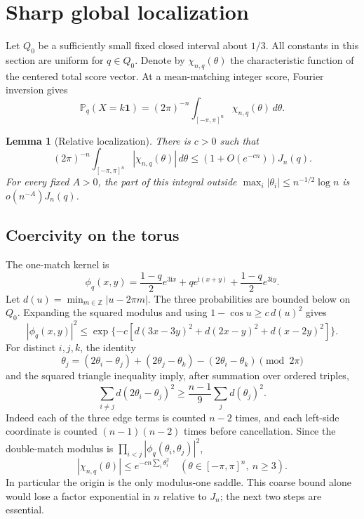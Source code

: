 \documentclass[11pt,a4paper]{article}
\numberwithin{equation}{section}
\newtheorem{lemma}[theorem]{Lemma}
\theoremstyle{remark}
\newcommand{\Prob}{\mathbb P}
\newcommand{\Z}{\mathbb Z}
\newcommand{\1}{\mathbf 1}
\newcommand{\ii}{\mathrm i}
\begin{document}
\section{Sharp global localization}\label{tfs:sec:localize}
Let $Q_0$ be a sufficiently small fixed closed interval about $1/3$.
All constants in this section are uniform for $q\in Q_0$. Denote by
$\chi_{n,q}(\theta)$ the characteristic function of the centered total
score vector. At a mean-matching integer score, Fourier inversion gives
\[
\Prob_q(X=k\1)=(2\pi)^{-n}\int_{[-\pi,\pi]^n}\chi_{n,q}(\theta)\,d\theta.
\]

\begin{lemma}[Relative localization]\label{tfs:lem:localize}
There is $c>0$ such that
\begin{equation}\label{tfs:eq:integralbound}
(2\pi)^{-n}\int_{[-\pi,\pi]^n}|\chi_{n,q}(\theta)|\,d\theta
       \leq (1+O(e^{-cn}))J_n(q).
\end{equation}
For every fixed $A>0$, the part of this integral outside
$\max_i|\theta_i|\leq n^{-1/2}\log n$ is $o(n^{-A})J_n(q)$.
\end{lemma}

\subsection{Coercivity on the torus}
The one-match kernel is
\[
\phi_q(x,y)=\frac{1-q}{2}e^{3\ii x}+q e^{\ii(x+y)}
                              +\frac{1-q}{2}e^{3\ii y}.
\]
Let $d(u)=\min_{m\in\Z}|u-2\pi m|$. The three probabilities are bounded
below on $Q_0$. Expanding the squared modulus and using
$1-\cos u\geq c\,d(u)^2$ gives
\begin{equation}\label{tfs:eq:edgecoercive}
|\phi_q(x,y)|^2\leq
\exp\{-c[d(3x-3y)^2+d(2x-y)^2+d(x-2y)^2]\}.
\end{equation}
For distinct $i,j,k$, the identity
\[
\theta_j=(2\theta_i-\theta_j)+(2\theta_j-\theta_k)
                       -(2\theta_i-\theta_k)\pmod{2\pi}
\]
and the squared triangle inequality imply, after summation over ordered
triples,
\[
\sum_{i\ne j}d(2\theta_i-\theta_j)^2
             \geq\frac{n-1}{9}\sum_jd(\theta_j)^2.
\]
Indeed each of the three edge terms is counted $n-2$ times, and each
left-side coordinate is counted $(n-1)(n-2)$ times before cancellation.
Since the double-match modulus is $\prod_{i<j}|\phi_q(\theta_i,\theta_j)|^2$,
\begin{equation}\label{tfs:eq:coercive}
|\chi_{n,q}(\theta)|\leq e^{-cn\sum_i\theta_i^2}
                 \quad(\theta\in[-\pi,\pi]^n,\ n\geq3).
\end{equation}
In particular the origin is the only modulus-one saddle. This coarse
bound alone would lose a factor exponential in $n$ relative to $J_n$;
the next two steps are essential.
\end{document}
